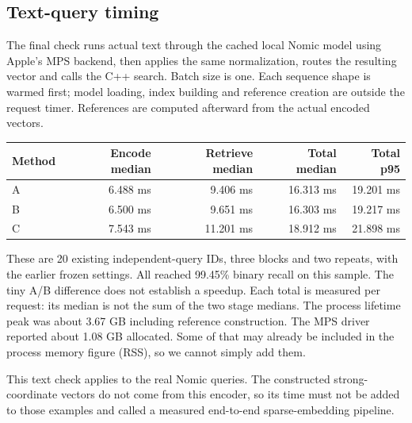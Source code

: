 \subsection{Text-query timing}
The final check runs actual text through the cached local Nomic model using Apple's MPS
backend, then applies
the same normalization, routes the resulting vector and calls the C++ search. Batch size is
one. Each sequence shape is warmed first; model loading, index building and reference creation
are outside the request timer. References are computed afterward from the actual encoded vectors.

\begin{center}\small
\begin{tabular}{@{}lrrrr@{}}\toprule
Method & Encode median & Retrieve median & Total median & Total p95\\\midrule
A & 6.488 ms & 9.406 ms & 16.313 ms & 19.201 ms\\
B & 6.500 ms & 9.651 ms & 16.303 ms & 19.217 ms\\
C & 7.543 ms & 11.201 ms & 18.912 ms & 21.898 ms\\\bottomrule
\end{tabular}\normalsize\end{center}
These are 20 existing independent-query IDs, three blocks and two repeats, with the earlier
frozen settings. All reached 99.45\% binary recall on this sample. The tiny A/B difference does
not establish a speedup. Each total is measured per request: its median is not the sum of the
two stage medians. The process lifetime peak was about 3.67 GB including reference construction.
The MPS driver reported about 1.08 GB allocated. Some of that may already be included in
the process memory figure (RSS), so we cannot simply add them.

This text check applies to the real Nomic queries. The constructed strong-coordinate vectors
do not come from this encoder, so its time must not be added to those examples and called a
measured end-to-end sparse-embedding pipeline.
